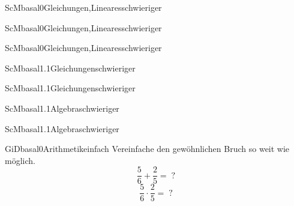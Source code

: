 \documentclass[12pt]{article}
\begin{document}
\begin{Add}{ScM}{basal0}{Gleichungen,Lineares}{schwieriger}
\end{Add}

\begin{Add}{ScM}{basal0}{Gleichungen,Lineares}{schwieriger}
\end{Add}

\begin{Add}{ScM}{basal0}{Gleichungen,Lineares}{schwieriger}
\end{Add}

\begin{Add}{ScM}{basal1.1}{Gleichungen}{schwieriger}
\end{Add}

\begin{Add}{ScM}{basal1.1}{Gleichungen}{schwieriger}
\end{Add}

\begin{Add}{ScM}{basal1.1}{Algebra}{schwieriger}
\end{Add}

\begin{Add}{ScM}{basal1.1}{Algebra}{schwieriger}
\end{Add}


\begin{Add}{GiD}{basal0}{Arithmetik}{einfach}
    \question
    {Vereinfache den gewöhnlichen Bruch so weit wie möglich.
        $$\frac{5}{6}+\frac{2}{5}=\;?$$
        $$\frac{5}{6}\cdot\frac{2}{5}=\;?$$
    }
\end{Add}
\end{document}
